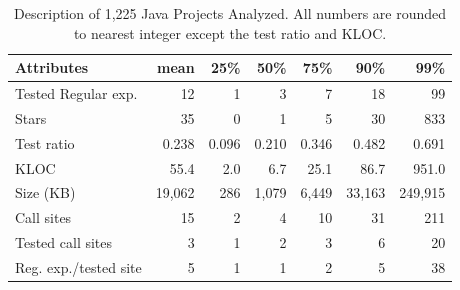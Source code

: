 
\begin{table}[tb]
\caption{Description of 1,225 Java Projects Analyzed. All numbers are rounded to nearest integer except the test ratio and KLOC.}
\label{regex:distriprojects}
\vspace{-6pt}
\begin{small}
\begin{tabular}{p{2.4cm}@{}r r r r r r}
\hline
Attributes & mean & 25\% & 50\% & 75\% & 90\% & 99\%  \\
\hline
Tested Regular exp. & 12 & 1    & 3     & 7    & 18   & 99 \\
Stars& 35 & 0 & 1 & 5 & 30 & 833 \\
Test ratio & 0.238 & 0.096 & 0.210 & 0.346 & 0.482 & 0.691\\ 
KLOC & 55.4 & 2.0 & 6.7 & 25.1 & 86.7 & 951.0 \\ 
Size (KB) & 19,062 & 286 & 1,079 & 6,449 & 33,163 & 249,915 \\ 
\hline
\hline
Call sites 		  & 15 & 2 & 4 & 10 & 31 & 211 \\
Tested call sites & 3 & 1 & 2 & 3 & 6 & 20 \\
Reg. exp./tested site & 5 & 1 & 1 & 2 & 5 & 38 \\
\hline
\end{tabular}
\end{small}
\vspace{-6pt}
\end{table}


